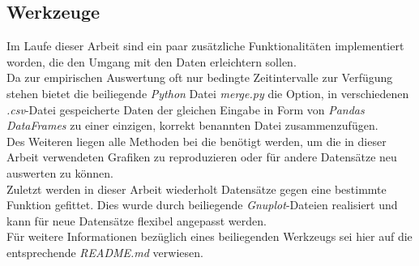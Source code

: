 \subsection{Werkzeuge}
Im Laufe dieser Arbeit sind ein paar zusätzliche Funktionalitäten implementiert worden, die den Umgang mit den Daten erleichtern sollen.\\[.05cm]
Da zur empirischen Auswertung oft nur bedingte Zeitintervalle zur Verfügung stehen bietet die beiliegende \textit{Python} Datei \textit{merge.py} die Option, in verschiedenen \textit{.csv}-Datei gespeicherte Daten der gleichen Eingabe in Form von \textit{Pandas DataFrames} zu einer einzigen, korrekt benannten Datei zusammenzufügen.\\[.1cm]
Des Weiteren liegen alle Methoden bei die benötigt werden, um die in dieser Arbeit verwendeten Grafiken zu reproduzieren oder für andere Datensätze neu auswerten zu können.\\[.1cm]
Zuletzt werden in dieser Arbeit wiederholt Datensätze gegen eine bestimmte Funktion gefittet. Dies wurde durch beiliegende \textit{Gnuplot}-Dateien realisiert und kann für neue Datensätze flexibel angepasst werden.\\[.1cm]
Für weitere Informationen bezüglich eines beiliegenden Werkzeugs sei hier auf die entsprechende \textit{README.md} verwiesen. 





